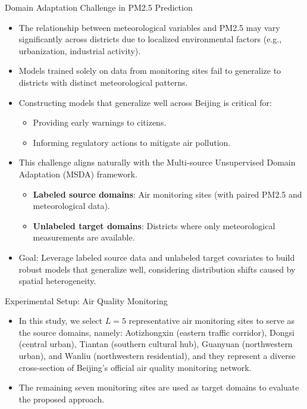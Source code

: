 \documentclass{beamer}
\begin{document}
\begin{frame}{Domain Adaptation Challenge in PM2.5 Prediction}
    \begin{itemize}
        \item The relationship between meteorological variables and PM2.5 may vary significantly across districts due to localized environmental factors (e.g., urbanization, industrial activity).
        \item Models trained solely on data from monitoring sites fail to generalize to districts with distinct meteorological patterns.
        \item Constructing models that generalize well across Beijing is critical for:
        \begin{itemize}
            \item Providing early warnings to citizens.
            \item Informing regulatory actions to mitigate air pollution.
        \end{itemize}
        \item This challenge aligns naturally with the Multi-source Unsupervised Domain Adaptation (MSDA) framework.
        \begin{itemize}
            \item \textbf{Labeled source domains}: Air monitoring sites (with paired PM2.5 and meteorological data).
            \item \textbf{Unlabeled target domains}: Districts where only meteorological measurements are available.
        \end{itemize}
        \item Goal: Leverage labeled source data and unlabeled target covariates to build robust models that generalize well, considering distribution shifts caused by spatial heterogeneity.
    \end{itemize}
\end{frame}
\begin{frame}{Experimental Setup: Air Quality Monitoring}
    \begin{itemize}
        \item In this study, we select $L = 5$ representative air monitoring sites to serve as the source domains, namely: Aotizhongxin (eastern traffic corridor), Dongsi (central urban), Tiantan (southern cultural hub), Guanyuan (northwestern urban), and Wanliu (northwestern residential), and they represent a diverse cross-section of Beijing’s official air quality monitoring network.
        \item The remaining seven monitoring sites are used as target domains to evaluate the proposed approach.
    \end{itemize}
\end{frame}
\end{document}
